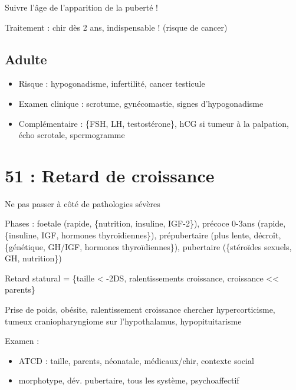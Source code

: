 \documentclass[11pt]{article}
\begin{document}
Suivre l'âge de l'apparition de la puberté !

Traitement : chir dès 2 ans, indispensable ! (risque de cancer)
\subsection{Adulte}
\label{sec:org7446ae2}
\begin{itemize}
\item Risque : hypogonadisme, infertilité, cancer testicule
\item Examen clinique : scrotume, gynécomastie, signes d'hypogonadisme
\item Complémentaire : \{FSH, LH, testostérone\}, hCG si tumeur à la palpation, écho
scrotale, spermogramme
\end{itemize}
\section{51 : Retard de croissance}
\label{sec:orga2c2bc9}
\danger Ne pas passer à côté de pathologies sévères

Phases : foetale (rapide, \{nutrition, insuline, IGF-2\}), précoce 0-3ans (rapide,
\{insuline, IGF, hormones thyroïdiennes\}), prépubertaire (plus lente, décroît,
\{génétique, GH/IGF, hormones thyroïdiennes\}), pubertaire (\{stéroïdes sexuels,
GH, nutrition\})

Retard statural = \{taille < -2DS, ralentissements croissance, croissance <<
parents\}

Prise de poids, obésite, ralentissement croissance \thus chercher
hypercorticisme, tumeux craniopharyngiome sur l'hypothalamus, hypopituitarisme

Examen :
\begin{itemize}
\item ATCD : taille, parents, néonatale, médicaux/chir, contexte social
\item morphotype, dév. pubertaire, tous les système, psychoaffectif
\end{itemize}
\end{document}
